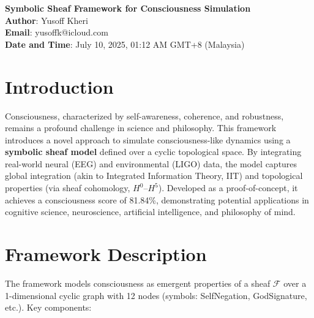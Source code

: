 \documentclass[12pt]{article}
\begin{document}
\begin{center}
    \textbf{\Large Symbolic Sheaf Framework for Consciousness Simulation} \\
    \vspace{0.5cm}
    \textbf{Author}: Yusoff Kheri \\
    \textbf{Email}: yusoffk@icloud.com \\
    \textbf{Date and Time}: July 10, 2025, 01:12 AM GMT+8 (Malaysia)
\end{center}

\section*{Introduction}
Consciousness, characterized by self-awareness, coherence, and robustness, remains a profound challenge in science and philosophy. This framework introduces a novel approach to simulate consciousness-like dynamics using a \textbf{symbolic sheaf model} defined over a cyclic topological space. By integrating real-world neural (EEG) and environmental (LIGO) data, the model captures global integration (akin to Integrated Information Theory, IIT) and topological properties (via sheaf cohomology, $H^0$--$H^5$). Developed as a proof-of-concept, it achieves a consciousness score of 81.84\%, demonstrating potential applications in cognitive science, neuroscience, artificial intelligence, and philosophy of mind.

\section*{Framework Description}
The framework models consciousness as emergent properties of a sheaf $\mathcal{F}$ over a 1-dimensional cyclic graph with 12 nodes (symbols: SelfNegation, GodSignature, etc.). Key components:
\end{document}
